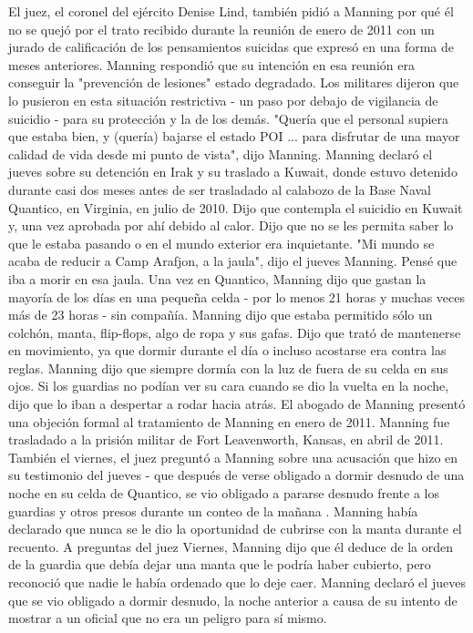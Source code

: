 El juez, el coronel del ejército Denise Lind, también pidió a Manning por qué él no se quejó por el trato recibido durante la reunión de enero de 2011 con un jurado de calificación de los pensamientos suicidas que expresó en una forma de meses anteriores.
Manning respondió que su intención en esa reunión era conseguir la "prevención de lesiones" estado degradado.
Los militares dijeron que lo pusieron en esta situación restrictiva - un paso por debajo de vigilancia de suicidio - para su protección y la de los demás.
"Quería que el personal supiera que estaba bien, y (quería) bajarse el estado POI ... para disfrutar de una mayor calidad de vida desde mi punto de vista", dijo Manning.
Manning declaró el jueves sobre su detención en Irak y su traslado a Kuwait, donde estuvo detenido durante casi dos meses antes de ser trasladado al calabozo de la Base Naval Quantico, en Virginia, en julio de 2010.
Dijo que contempla el suicidio en Kuwait y, una vez aprobada por ahí debido al calor.
Dijo que no se les permita saber lo que le estaba pasando o en el mundo exterior era inquietante.
"Mi mundo se acaba de reducir a Camp Arafjon, a la jaula", dijo el jueves Manning.
Pensé que iba a morir en esa jaula.
Una vez en Quantico, Manning dijo que gastan la mayoría de los días en una pequeña celda - por lo menos 21 horas y muchas veces más de 23 horas - sin compañía.
Manning dijo que estaba permitido sólo un colchón, manta, flip-flops, algo de ropa y sus gafas.
Dijo que trató de mantenerse en movimiento, ya que dormir durante el día o incluso acostarse era contra las reglas.
Manning dijo que siempre dormía con la luz de fuera de su celda en sus ojos.
Si los guardias no podían ver su cara cuando se dio la vuelta en la noche, dijo que lo iban a despertar a rodar hacia atrás.
El abogado de Manning presentó una objeción formal al tratamiento de Manning en enero de 2011.
Manning fue trasladado a la prisión militar de Fort Leavenworth, Kansas, en abril de 2011.
También el viernes, el juez preguntó a Manning sobre una acusación que hizo en su testimonio del jueves - que después de verse obligado a dormir desnudo de una noche en su celda de Quantico, se vio obligado a pararse desnudo frente a los guardias y otros presos durante un conteo de la mañana .
Manning había declarado que nunca se le dio la oportunidad de cubrirse con la manta durante el recuento.
A preguntas del juez Viernes, Manning dijo que él deduce de la orden de la guardia que debía dejar una manta que le podría haber cubierto, pero reconoció que nadie le había ordenado que lo deje caer.
Manning declaró el jueves que se vio obligado a dormir desnudo, la noche anterior a causa de su intento de mostrar a un oficial que no era un peligro para sí mismo.
